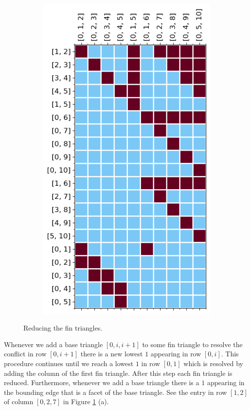 \begin{figure}[H]
\begin{subfigure}[l]{0.49\textwidth}
\begin{center}
\end{center}
\end{subfigure}
\begin{subfigure}[r]{0.49\textwidth}
\begin{center}
\includegraphics[scale=0.6]{ConnectingMorsePersistence/Figures/Reduction/final.png}
\end{center}
\end{subfigure}
\caption{Reducing the fin triangles.}
\label{fig:finfin}
\end{figure} 

Whenever we add a base triangle $[0,i,i+1]$ to some fin triangle to resolve the conflict in row $[0,i+1]$ there is a new lowest $1$ appearing in row $[0,i]$. This procedure continues until we reach a lowest $1$ in row $[0,1]$ which is resolved by adding the column of the first fin triangle. After this step each fin triangle is reduced. Furthermore, whenever we add a base triangle there is a $1$ appearing in the bounding edge that is a facet of the base triangle. See the entry in row $[1,2]$ of column $[0,2,7]$ in Figure \ref{fig:finfin} (a). 

